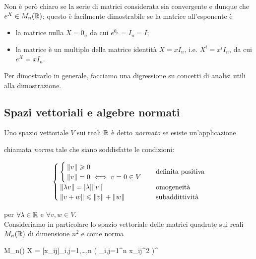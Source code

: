 Non è però chiaro se la serie di matrici considerata sia convergente e dunque che $ e^{X} \in M_{n}(\mathbb{R}) $: questo è facilmente dimostrabile se la matrice all'esponente è

\begin{itemize}
	\item la matrice nulla $ X = 0_{n} $ da cui $ e^{0_{n}} = I_{n} = I $;
	
	\item la matrice è un multiplo della matrice identità $ X = x I_{n} $, i.e. $ X^{i} = x^{i} I_{n} $, da cui $ e^{X} = x I_{n} $.
\end{itemize}

Per dimostrarlo in generale, facciamo una digressione su concetti di analisi utili alla dimostrazione.

\subsection{Spazi vettoriali e algebre normati}

Uno spazio vettoriale $ V $ sui reali $ \mathbb{R} $ è detto \textit{normato} se esiste un'applicazione


chiamata \textit{norma} tale che siano soddisfatte le condizioni:

\begin{equation}
	\begin{cases}
		\begin{cases}
			\norm{v} \geqslant 0\\
			\norm{v} = 0 \iff v = 0 \in V
		\end{cases}%
		 & \text{definita positiva}\\
		\norm{\lambda v} = \abs{\lambda} \norm{v} & \text{omogeneità}\\
		\norm{v + w} \leqslant \norm{v} + \norm{w} & \text{subaddittività}
	\end{cases}
\end{equation}

per $ \forall \lambda \in \mathbb{R} $ e $ \forall v,w \in V $.\\
Consideriamo in particolare lo spazio vettoriale delle matrici quadrate sui reali $ M_{n}(\mathbb{R}) $ di dimensione $ n^{2} $ e come norma

\map{\norm{}}%
	{M_{n}(\R)}%
	{\R}%
	{X = [x_{ij}]_{i,j=1,\dots,n}}%
	{\left( \sum_{i,j=1}^{n} x_{ij}^{2} \right)^{}}
	
